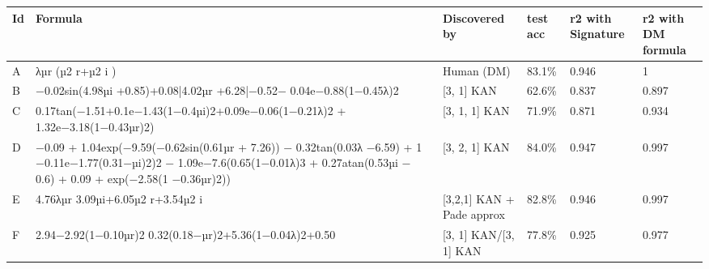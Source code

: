 \begin{tabular}{llllll}
\toprule
Id & Formula & Discovered by & test acc & r2 with Signature & r2 with DM formula \\
\midrule
A & λµr (µ2 r+µ2 i ) & Human (DM) & 83.1\% & 0.946 & 1 \\
B & −0.02sin(4.98µi +0.85)+0.08|4.02µr +6.28|−0.52− 0.04e−0.88(1−0.45λ)2 & [3, 1] KAN & 62.6\% & 0.837 & 0.897 \\
C & 0.17tan(−1.51+0.1e−1.43(1−0.4µi)2+0.09e−0.06(1−0.21λ)2 + 1.32e−3.18(1−0.43µr)2) & [3, 1, 1] KAN & 71.9\% & 0.871 & 0.934 \\
D & −0.09 + 1.04exp(−9.59(−0.62sin(0.61µr + 7.26)) − 0.32tan(0.03λ −6.59) + 1 −0.11e−1.77(0.31−µi)2)2 − 1.09e−7.6(0.65(1−0.01λ)3 + 0.27atan(0.53µi − 0.6) + 0.09 + exp(−2.58(1 −0.36µr)2)) & [3, 2, 1] KAN & 84.0\% & 0.947 & 0.997 \\
E & 4.76λµr 3.09µi+6.05µ2 r+3.54µ2 i & [3,2,1] KAN + Pade approx & 82.8\% & 0.946 & 0.997 \\
F & 2.94−2.92(1−0.10µr)2 0.32(0.18−µr)2+5.36(1−0.04λ)2+0.50 & [3, 1] KAN/[3, 1] KAN & 77.8\% & 0.925 & 0.977 \\
\bottomrule
\end{tabular}
